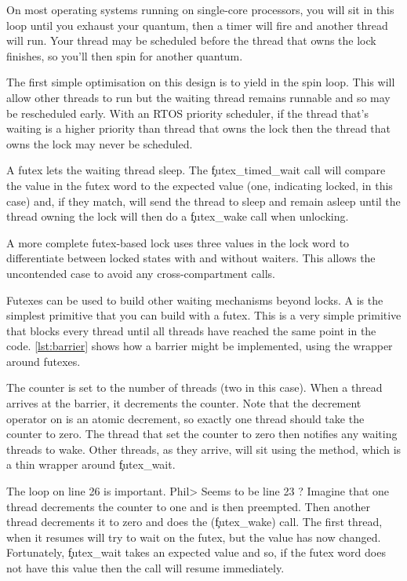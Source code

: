 On most operating systems running on single-core processors, you will sit in this loop until you exhaust your quantum, then a timer will fire and another thread will run.
Your thread may be scheduled before the thread that owns the lock finishes, so you'll then spin for another quantum.

The first simple optimisation on this design is to yield in the spin loop.
This will allow other threads to run but the waiting thread remains runnable and so may be rescheduled early.
With an RTOS priority scheduler, if the thread that's waiting is a higher priority than thread that owns the lock then the thread that owns the lock may never be scheduled.

A futex lets the waiting thread sleep.
The \c{futex_timed_wait} call will compare the value in the futex word to the expected value (one, indicating locked, in this case) and, if they match, will send the thread to sleep and remain asleep until the thread owning the lock will then do a \c{futex_wake} call when unlocking.

A more complete futex-based lock uses three values in the lock word to differentiate between locked states with and without waiters.
This allows the uncontended case to avoid any cross-compartment calls.

Futexes can be used to build other waiting mechanisms beyond locks.
A  is the simplest primitive that you can build with a futex.
This is a very simple primitive that blocks every thread until all threads have reached the same point in the code.
\ref{lst:barrier} shows how a barrier might be implemented, using the  wrapper around futexes.

\codelisting[filename=examples/barrier/barrier.cc,marker=entry,label=lst:barrier,caption="Implementing a barrier with a futex"]{}

The counter is set to the number of threads (two in this case).
When a thread arrives at the barrier, it decrements the counter.
Note that the decrement operator on  is an atomic decrement, so exactly one thread should take the counter to zero.
The thread that set the counter to zero then notifies any waiting threads to wake.
Other threads, as they arrive, will sit using the  method, which is a thin wrapper around \c{futex_wait}.

The loop on line 26 is important.
Phil> Seems to be line 23 ?
Imagine that one thread decrements the counter to one and is then preempted.
Then another thread decrements it to zero and does the  (\c{futex_wake}) call.
The first thread, when it resumes will try to wait on the futex, but the value has now changed.
Fortunately, \c{futex_wait} takes an expected value and so, if the futex word does not have this value then the call will resume immediately.


